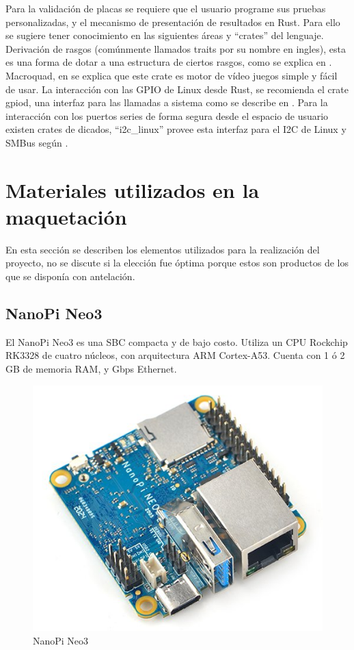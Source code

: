 \documentclass[12pt,letterpaper]{article}     %
\begin{document}
Para la validación de placas se requiere que el usuario programe sus pruebas personalizadas, y el mecanismo de 
presentación de resultados en Rust. Para ello se sugiere tener conocimiento en las siguientes áreas y ``crates''
del lenguaje. Derivación de rasgos (comúnmente llamados traits por su nombre en ingles), esta es una forma de 
dotar a una estructura de ciertos rasgos, como se explica en \cite{RustByExample_Derive}. 
Macroquad, en \cite{Macroquad_rs} se explica que este crate es motor de vídeo juegos simple y fácil de usar. 
La interacción con las GPIO de Linux desde Rust, se recomienda el crate gpiod, una interfaz para las llamadas 
a sistema como se describe en \cite{gpiod}.
Para la interacción con los puertos series de forma segura desde el espacio de usuario existen crates de dicados,
``i2c\_linux'' provee esta interfaz para el I2C de Linux y SMBus según \cite{i2c_linux}.

\clearpage
\section{Materiales utilizados en la maquetación}

En esta sección se describen los elementos utilizados para la realización del proyecto, no se discute si la
elección fue óptima porque estos son productos de los que se disponía con antelación.

\subsection{NanoPi Neo3}

El NanoPi Neo3 es una SBC compacta y de bajo costo. Utiliza un CPU Rockchip RK3328 de cuatro núcleos, con
arquitectura ARM Cortex-A53. Cuenta con 1 ó 2 GB de memoria RAM, y Gbps Ethernet. 

\begin{figure}[!ht]
\centering
\includegraphics[scale=0.5]{imagenes/naopi.jpg}
\caption{NanoPi Neo3}
\label{fig:nanopi}
\end{figure}
\end{document}
